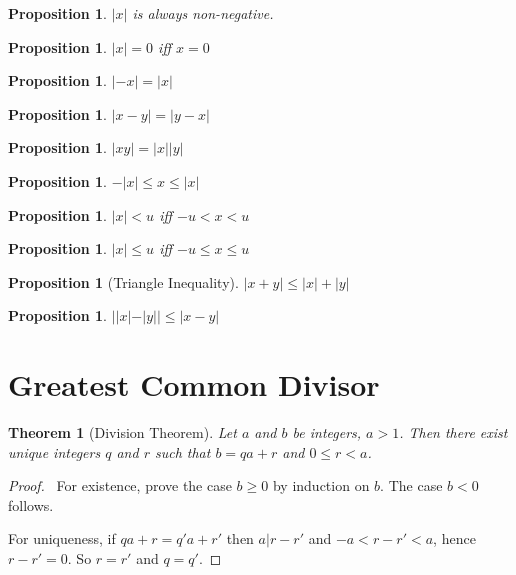 \documentclass{article}
\let\qed\relax
\newtheorem{proposition}[axiom]{Proposition}
\newtheorem{theorem}[axiom]{Theorem}
\theoremstyle{definition}
\begin{document}
    \begin{proposition}
        $|x|$ is always non-negative.
    \end{proposition}

    \begin{proposition}
        $|x| = 0$ iff $x = 0$
    \end{proposition}

    \begin{proposition}
        $|-x| = |x|$
    \end{proposition}

    \begin{proposition}
        $|x-y| = |y-x|$
    \end{proposition}

    \begin{proposition}
        $|xy| = |x||y|$
    \end{proposition}

    \begin{proposition}
        $-|x| \leq x \leq |x|$
    \end{proposition}

    \begin{proposition}
        $|x| < u$ iff $-u < x < u$
    \end{proposition}

    \begin{proposition}
        $|x| \leq u$ iff $-u \leq x \leq u$
    \end{proposition}

    \begin{proposition}[Triangle Inequality]
        $|x + y| \leq |x| + |y|$
    \end{proposition}

    \begin{proposition}
        $||x| - |y|| \leq |x-y|$
    \end{proposition}

    \section{Greatest Common Divisor}

    \begin{theorem}[Division Theorem]
        Let $a$ and $b$ be integers, $a > 1$. Then there exist unique integers $q$ and $r$ such that
        $b = qa + r$ and $0 \leq r < a$.
    \end{theorem}

    \begin{proof}
        \pf\ For existence, prove the case $b \geq 0$ by induction on $b$. The case $b < 0$ follows.

        For uniqueness, if $qa + r = q'a + r'$ then $a | r - r'$ and $-a < r - r' < a$, hence $r - r' = 0$.
        So $r = r'$ and $q = q'$. \qed
    \end{proof}
\end{document}
